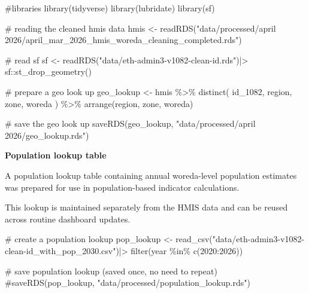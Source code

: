 \documentclass[
  letterpaper,
  DIV=11,
  numbers=noendperiod]{scrartcl}
\newenvironment{Shaded}{\begin{snugshade}}{\end{snugshade}}
\newcommand{\CommentTok}[1]{\textcolor[rgb]{0.37,0.37,0.37}{#1}}
\newcommand{\DecValTok}[1]{\textcolor[rgb]{0.68,0.00,0.00}{#1}}
\newcommand{\FunctionTok}[1]{\textcolor[rgb]{0.28,0.35,0.67}{#1}}
\newcommand{\NormalTok}[1]{\textcolor[rgb]{0.00,0.23,0.31}{#1}}
\newcommand{\OtherTok}[1]{\textcolor[rgb]{0.00,0.23,0.31}{#1}}
\newcommand{\SpecialCharTok}[1]{\textcolor[rgb]{0.37,0.37,0.37}{#1}}
\newcommand{\StringTok}[1]{\textcolor[rgb]{0.13,0.47,0.30}{#1}}
\begin{document}
\begin{Shaded}
\begin{Highlighting}[]
\CommentTok{\#libraries}
\FunctionTok{library}\NormalTok{(tidyverse)}
\FunctionTok{library}\NormalTok{(lubridate)}
\FunctionTok{library}\NormalTok{(sf)}

\CommentTok{\# reading the cleaned hmis data}
\NormalTok{hmis }\OtherTok{\textless{}{-}} \FunctionTok{readRDS}\NormalTok{(}\StringTok{"data/processed/april 2026/april\_mar\_2026\_hmis\_woreda\_cleaning\_completed.rds"}\NormalTok{)}

\CommentTok{\# read sf}
\NormalTok{sf }\OtherTok{\textless{}{-}} \FunctionTok{readRDS}\NormalTok{(}\StringTok{"data/eth{-}admin3{-}v1082{-}clean{-}id.rds"}\NormalTok{)}\SpecialCharTok{|\textgreater{}}
\NormalTok{  sf}\SpecialCharTok{::}\FunctionTok{st\_drop\_geometry}\NormalTok{()}


\CommentTok{\# prepare a geo look up}
\NormalTok{geo\_lookup }\OtherTok{\textless{}{-}}\NormalTok{ hmis }\SpecialCharTok{\%\textgreater{}\%}
  \FunctionTok{distinct}\NormalTok{(}
\NormalTok{    id\_1082,}
\NormalTok{    region,}
\NormalTok{    zone,}
\NormalTok{    woreda}
\NormalTok{  ) }\SpecialCharTok{\%\textgreater{}\%}
  \FunctionTok{arrange}\NormalTok{(region, zone, woreda)}

\CommentTok{\# save the geo look up}
\FunctionTok{saveRDS}\NormalTok{(geo\_lookup, }\StringTok{"data/processed/april 2026/geo\_lookup.rds"}\NormalTok{)}
\end{Highlighting}
\end{Shaded}

\textbf{Population lookup table}

A population lookup table containing annual woreda-level population
estimates was prepared for use in population-based indicator
calculations.

This lookup is maintained separately from the HMIS data and can be
reused across routine dashboard updates.

\begin{Shaded}
\begin{Highlighting}[]
\CommentTok{\# create a population lookup}
\NormalTok{pop\_lookup }\OtherTok{\textless{}{-}} \FunctionTok{read\_csv}\NormalTok{(}\StringTok{"data/eth{-}admin3{-}v1082{-}clean{-}id\_with\_pop\_2030.csv"}\NormalTok{)}\SpecialCharTok{|\textgreater{}}
  \FunctionTok{filter}\NormalTok{(year }\SpecialCharTok{\%in\%} \FunctionTok{c}\NormalTok{(}\DecValTok{2020}\SpecialCharTok{:}\DecValTok{2026}\NormalTok{))}

\CommentTok{\# save population lookup (saved once, no need to repeat)}
\CommentTok{\#saveRDS(pop\_lookup, "data/processed/population\_lookup.rds")}
\end{Highlighting}
\end{Shaded}
\end{document}
